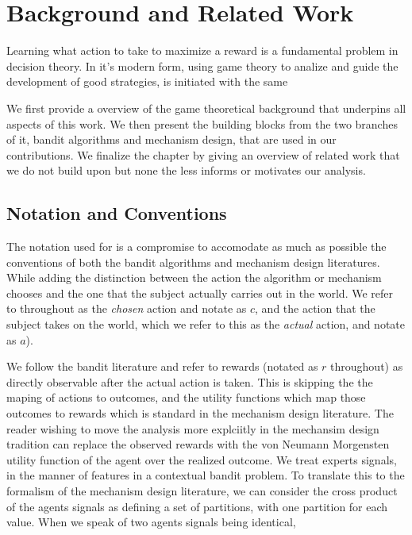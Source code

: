 \chapter{Background and Related Work}
\label{cha:background}



Learning what action to take to maximize a reward is a fundamental problem in decision theory. In it's modern form, using game theory to analize and guide the development of good strategies, is initiated with the same


We first provide a overview of the game theoretical background that underpins all aspects of this work.
We then present the building blocks from the two branches of it, bandit algorithms and mechanism design, that are used in our contributions.
We finalize the chapter by giving an overview of related work that we do not build upon but none the less informs or motivates our analysis.



\section{Notation and Conventions}


The notation used for is a compromise to accomodate as much as possible the conventions of both the bandit algorithms and mechanism design literatures. While adding the distinction between the action the algorithm or mechanism chooses and the one that the subject actually carries out in the world. We refer to throughout as the \emph{chosen} action and notate as $c$, and the action that the subject takes on the world, which we refer to this as the \emph{actual} action, and notate as $a$).

We follow the bandit literature and refer to rewards (notated as $r$ throughout) as directly observable after the actual action is taken. This is skipping the the maping of actions to outcomes, and the utility functions which map those outcomes to rewards which is standard in the mechanism design literature. The reader wishing to move the analysis more explciitly in the mechansim design tradition can replace the observed rewards with the von Neumann Morgensten utility function of the agent over the realized outcome.
We treat experts signals, in the manner of features in a contextual bandit problem. To translate this to the formalism of the mechanism design literature, we can consider the cross product of the agents signals as defining a set of partitions, with one partition for each value. 
When we speak of two agents signals being identical, 


